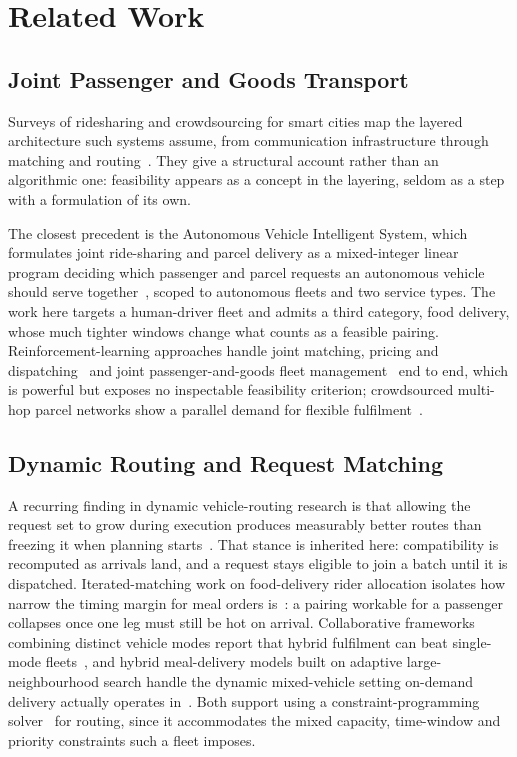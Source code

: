 \documentclass[conference]{IEEEtran}
\begin{document}
\section{Related Work}
\subsection{Joint Passenger and Goods Transport}
Surveys of ridesharing and crowdsourcing for smart cities map the layered architecture such systems assume, from communication infrastructure through matching and routing~\cite{ref2}. They give a structural account rather than an algorithmic one: feasibility appears as a concept in the layering, seldom as a step with a formulation of its own.

The closest precedent is the Autonomous Vehicle Intelligent System, which formulates joint ride-sharing and parcel delivery as a mixed-integer linear program deciding which passenger and parcel requests an autonomous vehicle should serve together~\cite{ref3}, scoped to autonomous fleets and two service types. The work here targets a human-driver fleet and admits a third category, food delivery, whose much tighter windows change what counts as a feasible pairing. Reinforcement-learning approaches handle joint matching, pricing and dispatching~\cite{ref4} and joint passenger-and-goods fleet management~\cite{ref5} end to end, which is powerful but exposes no inspectable feasibility criterion; crowdsourced multi-hop parcel networks show a parallel demand for flexible fulfilment~\cite{ref6}.

\subsection{Dynamic Routing and Request Matching}
A recurring finding in dynamic vehicle-routing research is that allowing the request set to grow during execution produces measurably better routes than freezing it when planning starts~\cite{ref7}. That stance is inherited here: compatibility is recomputed as arrivals land, and a request stays eligible to join a batch until it is dispatched. Iterated-matching work on food-delivery rider allocation isolates how narrow the timing margin for meal orders is~\cite{ref8}: a pairing workable for a passenger collapses once one leg must still be hot on arrival. Collaborative frameworks combining distinct vehicle modes report that hybrid fulfilment can beat single-mode fleets~\cite{ref9}, and hybrid meal-delivery models built on adaptive large-neighbourhood search handle the dynamic mixed-vehicle setting on-demand delivery actually operates in~\cite{ref10}. Both support using a constraint-programming solver~\cite{ref11} for routing, since it accommodates the mixed capacity, time-window and priority constraints such a fleet imposes.
\end{document}
